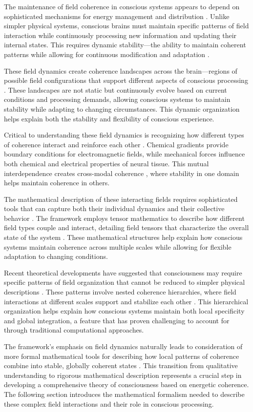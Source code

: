 The maintenance of field coherence in conscious systems appears to depend on sophisticated mechanisms for energy management and distribution \cite{Raichle2006}. Unlike simpler physical systems, conscious brains must maintain specific patterns of field interaction while continuously processing new information and updating their internal states. This requires dynamic stability—the ability to maintain coherent patterns while allowing for continuous modification and adaptation \cite{Singer2009}.

These field dynamics create coherence landscapes across the brain—regions of possible field configurations that support different aspects of conscious processing \cite{Atasoy2019}. These landscapes are not static but continuously evolve based on current conditions and processing demands, allowing conscious systems to maintain stability while adapting to changing circumstances. This dynamic organization helps explain both the stability and flexibility of conscious experience.

Critical to understanding these field dynamics is recognizing how different types of coherence interact and reinforce each other \cite{Freeman2006}. Chemical gradients provide boundary conditions for electromagnetic fields, while mechanical forces influence both chemical and electrical properties of neural tissue. This mutual interdependence creates cross-modal coherence \cite{DelGiudice1985}, where stability in one domain helps maintain coherence in others.

The mathematical description of these interacting fields requires sophisticated tools that can capture both their individual dynamics and their collective behavior \cite{Barrett2014}. The framework employs tensor mathematics to describe how different field types couple and interact, detailing field tensors that characterize the overall state of the system \cite{Aharonov1959}. These mathematical structures help explain how conscious systems maintain coherence across multiple scales while allowing for flexible adaptation to changing conditions.

Recent theoretical developments have suggested that consciousness may require specific patterns of field organization that cannot be reduced to simpler physical descriptions \cite{Nunez2010}. These patterns involve nested coherence hierarchies, where field interactions at different scales support and stabilize each other \cite{Wennekers2009}. This hierarchical organization helps explain how conscious systems maintain both local specificity and global integration, a feature that has proven challenging to account for through traditional computational approaches.

The framework's emphasis on field dynamics naturally leads to consideration of more formal mathematical tools for describing how local patterns of coherence combine into stable, globally coherent states \cite{Haken2006}. This transition from qualitative understanding to rigorous mathematical description represents a crucial step in developing a comprehensive theory of consciousness based on energetic coherence. The following section introduces the mathematical formalism needed to describe these complex field interactions and their role in conscious processing.